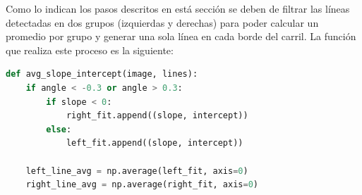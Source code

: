 Como lo indican los pasos descritos en está sección se deben de filtrar las líneas detectadas en dos grupos (izquierdas y derechas) para poder calcular un promedio por grupo y generar una sola línea en cada borde del carril. La función que realiza este proceso es la siguiente:

\hfill
\begin{lstlisting}[language=Python]
def avg_slope_intercept(image, lines):
    if angle < -0.3 or angle > 0.3:
        if slope < 0:
            right_fit.append((slope, intercept))    
        else:
            left_fit.append((slope, intercept)) 
    
    left_line_avg = np.average(left_fit, axis=0)    
    right_line_avg = np.average(right_fit, axis=0) 
\end{lstlisting}
\hfill

